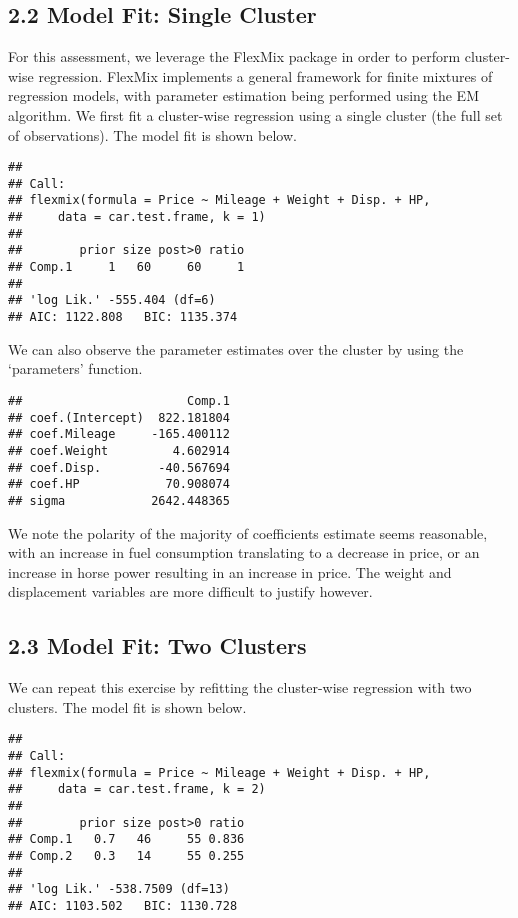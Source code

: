 \documentclass[]{article}
\begin{document}
\subsection{2.2 Model Fit: Single
Cluster}\label{model-fit-single-cluster}

For this assessment, we leverage the FlexMix package in order to perform
cluster-wise regression. FlexMix implements a general framework for
finite mixtures of regression models, with parameter estimation being
performed using the EM algorithm. We first fit a cluster-wise regression
using a single cluster (the full set of observations). The model fit is
shown below.

\begin{verbatim}
## 
## Call:
## flexmix(formula = Price ~ Mileage + Weight + Disp. + HP, 
##     data = car.test.frame, k = 1)
## 
##        prior size post>0 ratio
## Comp.1     1   60     60     1
## 
## 'log Lik.' -555.404 (df=6)
## AIC: 1122.808   BIC: 1135.374
\end{verbatim}

We can also observe the parameter estimates over the cluster by using
the `parameters' function.

\begin{verbatim}
##                       Comp.1
## coef.(Intercept)  822.181804
## coef.Mileage     -165.400112
## coef.Weight         4.602914
## coef.Disp.        -40.567694
## coef.HP            70.908074
## sigma            2642.448365
\end{verbatim}

We note the polarity of the majority of coefficients estimate seems
reasonable, with an increase in fuel consumption translating to a
decrease in price, or an increase in horse power resulting in an
increase in price. The weight and displacement variables are more
difficult to justify however.

\subsection{2.3 Model Fit: Two Clusters}\label{model-fit-two-clusters}

We can repeat this exercise by refitting the cluster-wise regression
with two clusters. The model fit is shown below.

\begin{verbatim}
## 
## Call:
## flexmix(formula = Price ~ Mileage + Weight + Disp. + HP, 
##     data = car.test.frame, k = 2)
## 
##        prior size post>0 ratio
## Comp.1   0.7   46     55 0.836
## Comp.2   0.3   14     55 0.255
## 
## 'log Lik.' -538.7509 (df=13)
## AIC: 1103.502   BIC: 1130.728
\end{verbatim}
\end{document}
